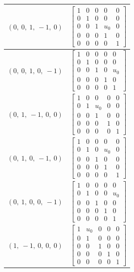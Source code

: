 \documentclass[11pt]{article}
\theoremstyle{definition}
\begin{document}
\begin{tabular}{|l|c|}
    \hline
    $\left( 0, \  0, \  1, \  -1, \  0\right)$ & $\left[\begin{matrix}1 & 0 & 0 & 0 & 0\\0 & 1 & 0 & 0 & 0\\0 & 0 & 1 & u_{0} & 0\\0 & 0 & 0 & 1 & 0\\0 & 0 & 0 & 0 & 1\end{matrix}\right]$ \\
    \hline
    $\left( 0, \  0, \  1, \  0, \  -1\right)$ & $\left[\begin{matrix}1 & 0 & 0 & 0 & 0\\0 & 1 & 0 & 0 & 0\\0 & 0 & 1 & 0 & u_{0}\\0 & 0 & 0 & 1 & 0\\0 & 0 & 0 & 0 & 1\end{matrix}\right]$ \\
    \hline
    $\left( 0, \  1, \  -1, \  0, \  0\right)$ & $\left[\begin{matrix}1 & 0 & 0 & 0 & 0\\0 & 1 & u_{0} & 0 & 0\\0 & 0 & 1 & 0 & 0\\0 & 0 & 0 & 1 & 0\\0 & 0 & 0 & 0 & 1\end{matrix}\right]$ \\
    \hline
    $\left( 0, \  1, \  0, \  -1, \  0\right)$ & $\left[\begin{matrix}1 & 0 & 0 & 0 & 0\\0 & 1 & 0 & u_{0} & 0\\0 & 0 & 1 & 0 & 0\\0 & 0 & 0 & 1 & 0\\0 & 0 & 0 & 0 & 1\end{matrix}\right]$ \\
    \hline
    $\left( 0, \  1, \  0, \  0, \  -1\right)$ & $\left[\begin{matrix}1 & 0 & 0 & 0 & 0\\0 & 1 & 0 & 0 & u_{0}\\0 & 0 & 1 & 0 & 0\\0 & 0 & 0 & 1 & 0\\0 & 0 & 0 & 0 & 1\end{matrix}\right]$ \\
    \hline
    $\left( 1, \  -1, \  0, \  0, \  0\right)$ & $\left[\begin{matrix}1 & u_{0} & 0 & 0 & 0\\0 & 1 & 0 & 0 & 0\\0 & 0 & 1 & 0 & 0\\0 & 0 & 0 & 1 & 0\\0 & 0 & 0 & 0 & 1\end{matrix}\right]$ \\

\end{tabular}
\end{document}
